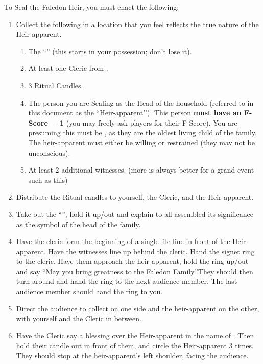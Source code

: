 \documentclass[green]{GL2020}
\begin{document}
To Seal the Faledon Heir, you must enact the following:
\begin{enumerate}
  \item Collect the following in a location that you feel reflects the true nature of the Heir-apparent.
    \begin{enumerate}
      \item The ``\iFaledonRing{}'' (this starts in your possession; don’t lose it).
      \item At least one Cleric from \pTech{}.
      \item 3 Ritual Candles.
      \item The person you are Sealing as the Head of the \cFaledonParent{\formal} household (referred to in this document as the ``Heir-apparent’’). This person \textbf{must have an F-Score = 1} (you may freely ask players for their F-Score). You are presuming this must be \cHeir{}, as they are the oldest living child of the \cFaledonParent{\formal} family. The heir-apparent must either be willing or restrained (they may not be unconscious).
      \item At least 2 additional witnesses. (more is always better for a grand event such as this)
    \end{enumerate}
  \item Distribute the Ritual candles to yourself, the Cleric, and the Heir-apparent.
  \item Take out the ``\iFaledonRing{}'', hold it up/out and explain to all assembled its significance as the symbol of the head of the \cFaledonParent{\formal} family.
  \item Have the cleric form the beginning of a single file line in front of the Heir-apparent. Have the witnesses line up behind the cleric. Hand the signet ring to the cleric. Have them approach the heir-apparent, hold the ring up/out and say ``May you bring greatness to the Faledon Family.''They should then turn around and hand the ring to the next audience member. The last audience member should hand the ring to you.
  \item Direct the audience to collect on one side and the heir-apparent on the other, with yourself and the Cleric in between.
  \item Have the Cleric say a blessing over the Heir-apparent in the name of \cTechGod{}. Then hold their candle out in front of them, and circle the Heir-apparent 3 times. They should stop at the heir-apparent’s left shoulder, facing the audience.
    \begin{enumerate}

\end{enumerate}
\end{enumerate}
\end{document}
